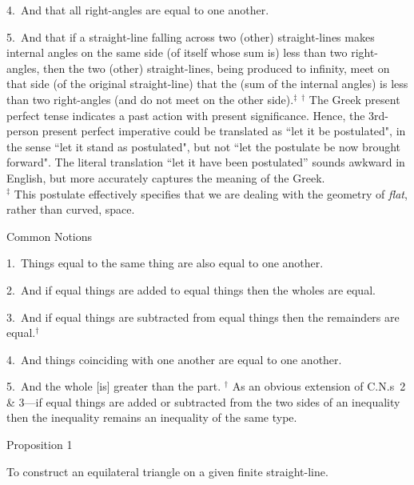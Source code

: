 4.~And that all right-angles are equal to one another.

5.~And that if a straight-line falling across two (other) straight-lines makes 
internal angles on the same side (of itself whose sum is) less than two right-angles, then the two (other) straight-lines, being produced to infinity, meet on that side (of the original straight-line) that the (sum of the internal angles) is less
than two right-angles (and do not meet on the other side).$^\ddag$
{\footnotesize
\noindent $^\dag$ The Greek present perfect tense indicates a past action with present
significance. Hence, the 3rd-person present perfect imperative  could be translated as ``let it be postulated", in the sense ``let it stand as postulated", but not  ``let the
postulate be now brought forward". The literal translation ``let it have been postulated'' sounds awkward in English, but more accurately captures the
meaning of the Greek.\\
\noindent $^\ddag$ This postulate effectively specifies that we are dealing with the geometry of
{\em flat}, rather than  curved, space.}


\begin{center}
{\large Common Notions}
\end{center}

1.~Things equal to the same thing are also equal to one another.

2.~And  if equal things are added to equal things then the wholes are equal.

3.~And if equal things are subtracted from equal things then the remainders are
equal.$^\dag$

4.~And things coinciding with one another are equal to one another.

5.~And the whole [is] greater than the part.
{\footnotesize
\noindent $^\dag$ As an obvious extension of C.N.s~2 \& 3---if equal things
are added or subtracted from the two sides of an inequality then  the inequality
remains an inequality of the same type.}\\


\begin{center}
{\large Proposition 1}
\end{center}
To construct an equilateral triangle on a given finite straight-line.

\epsfysize=1.75in
\centerline{}

